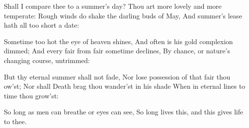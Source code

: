 \startlanguage[en]
\startlines
Shall I compare thee to a summer’s day?
Thou art more lovely and more temperate:
Rough winds do shake the darling buds of May,
And summer’s lease hath all too short a date:

Sometime too hot the eye of heaven shines,
And often is his gold complexion dimmed;
And every fair from fair sometime declines,
By chance, or nature’s changing course, untrimmed:

But thy eternal summer shall not fade,
Nor lose possession of that fair thou ow’st;
Nor shall Death brag thou wander’st in his shade
When in eternal lines to time thou grow’st:

So long as men can breathe or eyes can see,
So long lives this, and this gives life to thee.
\stoplines
\stoplanguage
